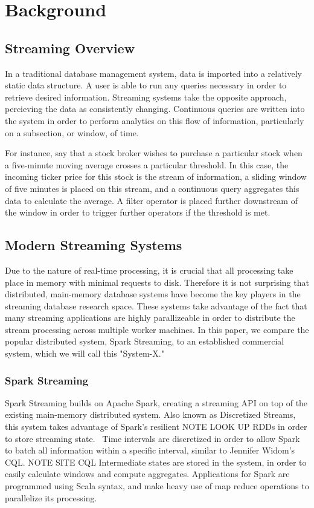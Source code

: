 \section{Background}
\subsection{Streaming Overview}
In a traditional database management system, data is imported into a relatively static data structure.  A user is able to run any queries necessary in order to retrieve desired information.  Streaming systems take the opposite approach, percieving the data as consistently changing.  Continuous queries are written into the system in order to perform analytics on this flow of information, particularly on a subsection, or window, of time.

For instance, say that a stock broker wishes to purchase a particular stock when a five-minute moving average crosses a particular threshold.  In this case, the incoming ticker price for this stock is the stream of information, a sliding window of five minutes is placed on this stream, and a continuous query aggregates this data to calculate the average.  A filter operator is placed further downstream of the window in order to trigger further operators if the threshold is met.

\subsection{Modern Streaming Systems}
Due to the nature of real-time processing, it is crucial that all processing take place in memory with minimal requests to disk.  Therefore it is not surprising that distributed, main-memory database systems have become the key players in the streaming database research space.  These systems take advantage of the fact that many streaming applications are highly parallizeable in order to distribute the stream processing across multiple worker machines.  In this paper, we compare the popular distributed system, Spark Streaming, to an established commercial system, which we will call this "System-X."

\subsubsection{Spark Streaming}
Spark Streaming builds on Apache Spark, creating a streaming API on top of the existing main-memory distributed system.  Also known as Discretized Streams, this system takes advantage of Spark's resilient NOTE LOOK UP RDDs in order to store streaming state.~\cite{dstreams}  Time intervals are discretized in order to allow Spark to batch all information within a specific interval, similar to Jennifer Widom's CQL. NOTE SITE CQL  Intermediate states are stored in the system, in order to easily calculate windows and compute aggregates.  Applications for Spark are programmed using Scala syntax, and make heavy use of map reduce operations to parallelize its processing.

